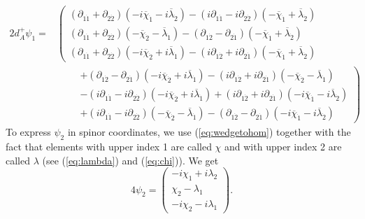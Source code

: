 \documentclass[twoside]{amsart}
\renewcommand{\eqref}[1]{(\ref{eq:#1})}
\newcommand{\enm}[1]{\ensuremath{#1}}
\renewcommand{\bar}[1]{\overline{#1}}
\newcommand{\dieven}[2]{\enm{\partial_{#1\dot{#2}}}}
\newcommand{\cbi}[1]{\enm{\bar{\chi}_{\dot{#1}}}}
\newcommand{\lbi}[1]{\enm{\bar{\lambda}_{\dot{#1}}}}
\begin{document}
\[
\begin{split}
2d_{A}^{+}\psi_{1} = &\left(
\begin{array}{c}
    (\dieven{1}{1}+\dieven{2}{2})(-i\cbi{1}-i\lbi{2})
    -(i\dieven{1}{1}-i\dieven{2}{2})(-\cbi{1}+\lbi{2})\\
%
    (\dieven{1}{1}+\dieven{2}{2})(-\cbi{2}-\lbi{1})
    -(\dieven{1}{2}-\dieven{2}{1})(-\cbi{1}+\lbi{2})\\
%
    (\dieven{1}{1}+\dieven{2}{2})(-i\cbi{2}+i\lbi{1})
    -(i\dieven{1}{2}+i\dieven{2}{1})(-\cbi{1}+\lbi{2})
\end{array}\right. \\
& \qquad\left.\begin{array}{c}
    +(\dieven{1}{2}-\dieven{2}{1})(-i\cbi{2}+i\lbi{1})
    -(i\dieven{1}{2}+i\dieven{2}{1})(-\cbi{2}-\lbi{1}) \\
%
    -(i\dieven{1}{1}-i\dieven{2}{2})(-i\cbi{2}+i\lbi{1})
    +(i\dieven{1}{2}+i\dieven{2}{1})(-i\cbi{1}-i\lbi{2}) \\
%
    +(i\dieven{1}{1}-i\dieven{2}{2})(-\cbi{2}-\lbi{1})
    -(\dieven{1}{2}-\dieven{2}{1})(-i\cbi{1}-i\lbi{2})
\end{array}\right)
\end{split}\]
To express \( \psi_{2} \) in spinor coordinates, we use
\eqref{wedgetohom} together with the fact that elements with upper
index 1 are called \( \chi \) and with upper index 2 are called \( \lambda
\) (see \eqref{lambda} and \eqref{chi}).  We get
\[ 4\psi_{2} = \left(
\begin{array}{c}
    -i\chi_{1}+i\lambda_{2} \\
    \chi_{2}-\lambda_{1} \\
    -i\chi_{2}-i\lambda_{1}
\end{array}\right).\]
\end{document}
